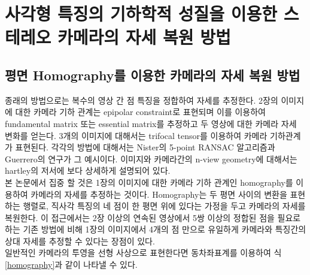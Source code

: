 \documentclass[master,korean,final]{cbnu-ecs}
\begin{document}
\newpage
\chapter{사각형 특징의 기하학적 성질을 이용한 스테레오 카메라의 자세 복원 방법}

\section{평면 Homography를 이용한 카메라의 자세 복원 방법}

종래의 방법으로는 복수의 영상 간 점 특징을 정합하여 자세를 추정한다. 2장의 이미지에 대한 카메라 기하 관계는 epipolar constraint로 표현되며 이를 이용하여 fundamental matrix 또는 essential matrix를 추정하고 두 영상에 대한 카메라 자세 변화를 얻는다. 3개의 이미지에 대해서는 trifocal tensor를 이용하여 카메라 기하관계가 표현된다. 각각의 방법에 대해서는 Nister의 5-point RANSAC 알고리즘\cite{Nister2005}과 Guerrero의 연구\cite{Guerrero2008}가 그 예시이다. 이미지와 카메라간의 n-view geometry에 대해서는 hartley의 저서\cite{Hartley2003}에 보다 상세하게 설명되어 있다.\\
본 논문에서 집중 할 것은 1장의 이미지에 대한 카메라 기하 관계인 homography를 이용하여 카메라의 자세를 추정하는 것이다. Homography는 두 평면 사이의 변환을 표현하는 행렬로, 직사각 특징의 네 점이 한 평면 위에 있다는 가정을 두고 카메라의 자세를 복원한다. 이 접근에서는 2장 이상의 연속된 영상에서 5쌍 이상의 정합된 점을 필요로 하는 기존 방법에 비해 1장의 이미지에서 4개의 점 만으로 유일하게 카메라와 특징간의 상대 자세를 추정할 수 있다는 장점이 있다. \\
일반적인 카메라의 투영을 선형 사상으로 표현한다면 동차좌표계를 이용하여 식 \eqref{homography}과 같이 나타낼 수 있다.
\end{document}
